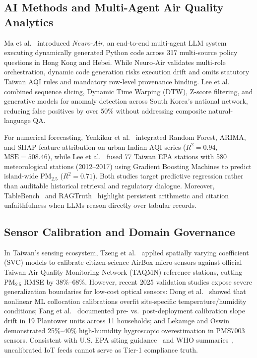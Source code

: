 \documentclass[conference]{IEEEtran}
\begin{document}
\subsection{AI Methods and Multi-Agent Air Quality Analytics}
Ma et al.~\cite{ma2026neuroair} introduced \emph{Neuro-Air}, an end-to-end multi-agent LLM system executing dynamically generated Python code across 317 multi-source policy questions in Hong Kong and Hebei. While Neuro-Air validates multi-role orchestration, dynamic code generation risks execution drift and omits statutory Taiwan AQI rules and mandatory row-level provenance binding. Lee et al.~\cite{lee2025anomaly} combined sequence slicing, Dynamic Time Warping (DTW), Z-score filtering, and generative models for anomaly detection across South Korea's national network, reducing false positives by over 50\% without addressing composite natural-language QA.

For numerical forecasting, Yenkikar et al.~\cite{yenkikar2025explainable} integrated Random Forest, ARIMA, and SHAP feature attribution on urban Indian AQI series ($R^2 = 0.94$, $\text{MSE} = 508.46$), while Lee et al.~\cite{lee2020forecasting} fused 77 Taiwan EPA stations with 580 meteorological stations (2012--2017) using Gradient Boosting Machines to predict island-wide $\text{PM}_{2.5}$ ($R^2 = 0.71$). Both studies target predictive regression rather than auditable historical retrieval and regulatory dialogue. Moreover, TableBench~\cite{wu2024tablebench} and RAGTruth~\cite{niu2024ragtruth} highlight persistent arithmetic and citation unfaithfulness when LLMs reason directly over tabular records.

\subsection{Sensor Calibration and Domain Governance}
In Taiwan's sensing ecosystem, Tzeng et al.~\cite{tzeng2023airbox} applied spatially varying coefficient (SVC) models to calibrate citizen-science AirBox micro-sensors against official Taiwan Air Quality Monitoring Network (TAQMN) reference stations, cutting $\text{PM}_{2.5}$ RMSE by 38\%--68\%. However, recent 2025 validation studies expose severe generalization boundaries for low-cost optical sensors: Dong et al.~\cite{dong2025calibration} showed that nonlinear ML collocation calibrations overfit site-specific temperature/humidity conditions; Fang et al.~\cite{fang2025deployment} documented pre- vs.\ post-deployment calibration slope drift in 19 Plantower units across 11 households; and Lekamge and Oswin~\cite{lekamge2025rh} demonstrated 25\%--40\% high-humidity hygroscopic overestimation in PMS7003 sensors. Consistent with U.S. EPA siting guidance~\cite{usepa_siting} and WHO summaries~\cite{who2021guidelines,who2025summary}, uncalibrated IoT feeds cannot serve as Tier-1 compliance truth.
\end{document}
